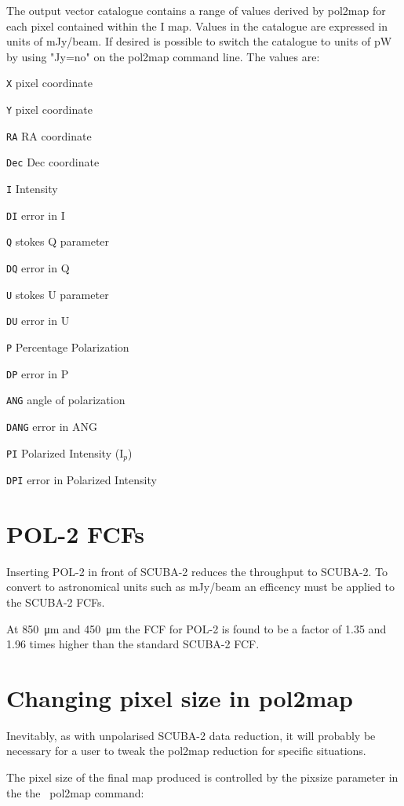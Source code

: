 The output vector catalogue contains a range of values derived by pol2map for each pixel
contained within the I map. Values in the catalogue are expressed in units of mJy/beam.
If desired is possible to switch the catalogue to units of pW by using "Jy=no" on the pol2map command line.
The values are:

\begin{aligndesc}
\item[\texttt{X}] pixel coordinate
\item[\texttt{Y}] pixel coordinate
\item[\texttt{RA}] RA coordinate
\item[\texttt{Dec}] Dec coordinate
\item[\texttt{I}] Intensity
\item[\texttt{DI}] error in I
\item[\texttt{Q}] stokes Q parameter
\item[\texttt{DQ}] error in Q
\item[\texttt{U}] stokes U parameter
\item[\texttt{DU}] error in U
\item[\texttt{P}] Percentage Polarization
\item[\texttt{DP}] error in P
\item[\texttt{ANG}] angle of polarization
\item[\texttt{DANG}] error in ANG
\item[\texttt{PI}] Polarized Intensity (I$_{p}$)
\item[\texttt{DPI}] error in Polarized Intensity
\end{aligndesc}


\section{POL-2 FCFs}
\label{sec:pol2map-fcf}

Inserting POL-2 in front of SCUBA-2 reduces the throughput to SCUBA-2. 
To convert to astronomical units such as mJy/beam an efficency must be applied to the SCUBA-2 FCFs. 

At \SI{850}{\micro\metre} and \SI{450}{\micro\metre} the FCF for POL-2 is found to be a factor of 1.35
and 1.96 times higher than the standard SCUBA-2 FCF.


\section{Changing pixel size in pol2map}
\label{sec:pol2map-pixelsize}

Inevitably, as with unpolarised SCUBA-2 data reduction, it will probably be necessary for a user to
tweak the pol2map reduction for specific situations.

The pixel size of the final map produced is controlled by the pixsize
parameter in the the \smurf\ pol2map command:

\begin{terminalv}
\end{terminalv}








